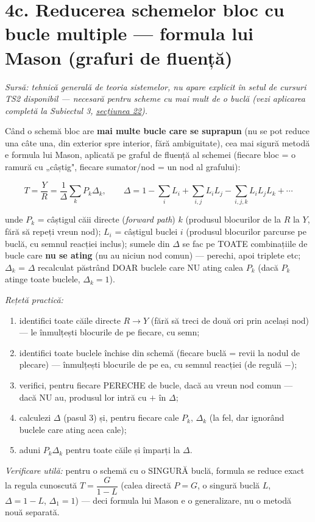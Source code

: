 \documentclass[10pt,a4paper]{article}
\newcommand{\srcnote}[1]{{\footnotesize\color{gray!55!black}\textit{Sursă: #1}}\par}
\newcommand{\tip}[1]{\textcolor{blue!55!black}{#1}}
\begin{document}
\section*{4c. Reducerea schemelor bloc cu bucle multiple — formula lui Mason (grafuri de fluență)}\label{sec:4c}
\srcnote{tehnică generală de teoria sistemelor, nu apare explicit în setul de cursuri TS2 disponibil — necesară pentru scheme cu mai mult de o buclă (vezi aplicarea completă la Subiectul 3, \hyperref[sec:22]{secțiunea 22}).}
Când o schemă bloc are \textbf{mai multe bucle care se suprapun} (nu se pot reduce una câte una, din exterior spre interior, fără ambiguitate), cea mai sigură metodă e formula lui Mason, aplicată pe graful de fluență al schemei (fiecare bloc = o ramură cu „câștig", fiecare sumator/nod = un nod al grafului):
\begin{keyeq}\color{red!65!black}
$$T=\dfrac YR=\dfrac1\Delta\sum_k P_k\Delta_k,\qquad \Delta=1-\sum_i L_i+\sum_{i,j}L_iL_j-\sum_{i,j,k}L_iL_jL_k+\cdots$$
\end{keyeq}
unde $P_k$ = câștigul căii directe (\textit{forward path}) $k$ (produsul blocurilor de la $R$ la $Y$, fără să repeți vreun nod); $L_i$ = câștigul buclei $i$ (produsul blocurilor parcurse pe buclă, cu semnul reacției inclus); sumele din $\Delta$ se fac pe TOATE combinațiile de bucle care \textbf{nu se ating} (nu au niciun nod comun) — perechi, apoi triplete etc; $\Delta_k$ = $\Delta$ recalculat păstrând DOAR buclele care NU ating calea $P_k$ (dacă $P_k$ atinge toate buclele, $\Delta_k{=}1$).

\textit{Rețetă practică:}
\begin{enumerate}
\item identifici toate căile directe $R\to Y$ (fără să treci de două ori prin același nod) — le înmulțești blocurile de pe fiecare, cu semn;
\item identifici toate buclele închise din schemă (fiecare buclă = revii la nodul de plecare) — înmulțești blocurile de pe ea, cu semnul reacției (de regulă $-$);
\item verifici, pentru fiecare PERECHE de bucle, dacă au vreun nod comun — dacă NU au, produsul lor intră cu $+$ în $\Delta$;
\item calculezi $\Delta$ (pasul 3) și, pentru fiecare cale $P_k$, $\Delta_k$ (la fel, dar ignorând buclele care ating acea cale);
\item aduni $P_k\Delta_k$ pentru toate căile și împarți la $\Delta$.
\end{enumerate}
\tip{\textit{Verificare utilă:} pentru o schemă cu o SINGURĂ buclă, formula se reduce exact la regula cunoscută $T{=}\dfrac{G}{1-L}$ (calea directă $P{=}G$, o singură buclă $L$, $\Delta{=}1{-}L$, $\Delta_1{=}1$) — deci formula lui Mason e o generalizare, nu o metodă nouă separată.}
\end{document}
